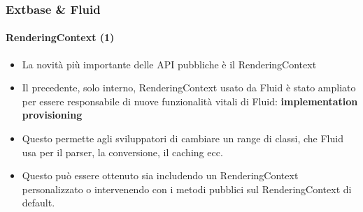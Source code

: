 
\begin{frame}[fragile]
	\frametitle{Extbase \& Fluid}
	\framesubtitle{RenderingContext (1)}

	\lstset{basicstyle=\tiny\ttfamily}

	\begin{itemize}

		\item La novità più importante delle API pubbliche è il RenderingContext

		\item Il precedente, solo interno, RenderingContext usato da Fluid è stato 
			ampliato per essere responsabile di nuove funzionalità vitali di Fluid:
			\textbf{implementation provisioning}

		\item Questo permette agli sviluppatori di cambiare un range di classi, che Fluid usa per
			il parser, la conversione, il caching ecc.

		\item Questo può essere ottenuto sia includendo un RenderingContext personalizzato o
			intervenendo con i metodi pubblici sul RenderingContext di default.

	\end{itemize}

\end{frame}


